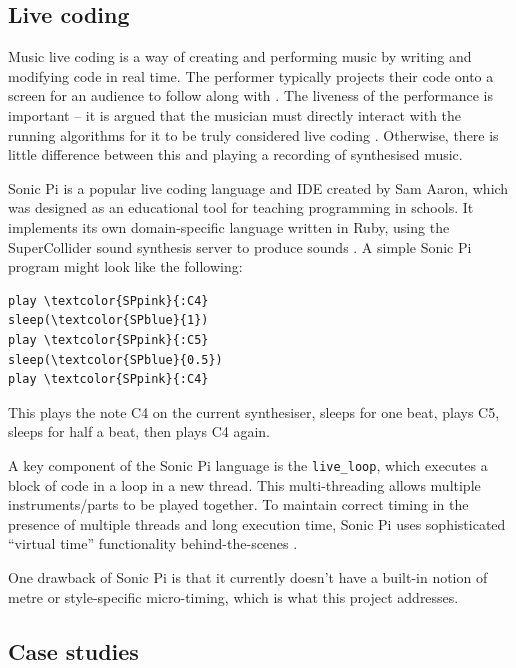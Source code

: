 \documentclass[12pt,twoside,openright]{report}
\begin{document}
\subsection{Live coding} \label{live_coding_background}

Music live coding is a way of creating and performing music by writing and
modifying code in real time. The performer typically projects their code onto a
screen for an audience to follow along with \cite{magnusson2011}. The liveness of the
performance is important -- it is argued that the musician must directly
interact with the running algorithms for it to be truly considered live coding
\cite{collins2011}. Otherwise, there is little difference between this and playing a
recording of synthesised music.

Sonic Pi is a popular live coding language and IDE created by Sam Aaron, which
was designed as an educational tool for teaching programming in schools. It
implements its own domain-specific language written in Ruby, using the
SuperCollider sound synthesis server to produce sounds \cite{aaron2013}. A simple
Sonic Pi program might look like the following:

\begin{BVerbatim}[commandchars=\\\{\}]
play \textcolor{SPpink}{:C4}
sleep(\textcolor{SPblue}{1})
play \textcolor{SPpink}{:C5}
sleep(\textcolor{SPblue}{0.5})
play \textcolor{SPpink}{:C4}
\end{BVerbatim}

This plays the note C4 on the current synthesiser, sleeps for one beat, plays C5,
sleeps for half a beat, then plays C4 again.

A key component of the Sonic Pi language is the \verb'live_loop', which executes a
block of code in a loop in a new thread. This multi-threading allows multiple instruments/parts to be played together. To maintain correct timing in the presence
of multiple threads and long execution time, Sonic Pi uses sophisticated
``virtual time'' functionality behind-the-scenes \cite{aaron2014}.

One drawback of Sonic Pi is that it currently doesn't have a built-in notion of
metre or style-specific micro-timing, which is what this project addresses.


\subsection{Case studies} \label{case_studies}
\end{document}
